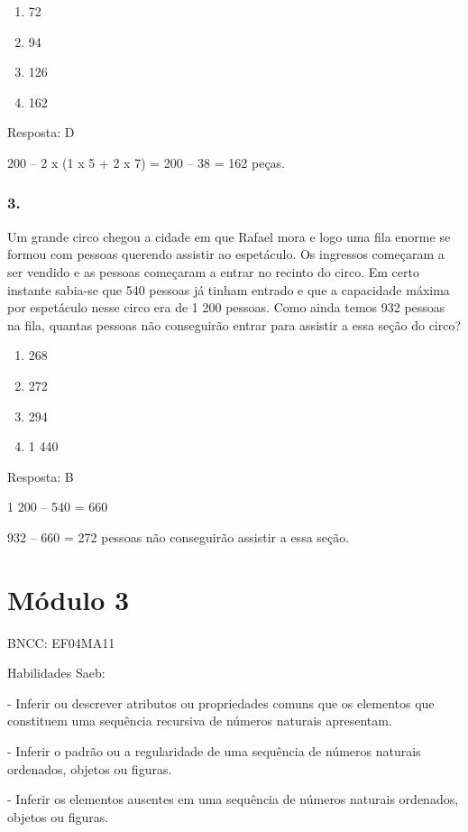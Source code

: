 \begin{enumerate}
\def\labelenumi{\alph{enumi})}
\item
  72
\item
  94
\item
  126
\item
  162
\end{enumerate}

Resposta: D

200 -- 2 x (1 x 5 + 2 x 7) = 200 -- 38 = 162 peças.

\subsubsection{3.}\label{section-25}

Um grande circo chegou a cidade em que Rafael mora e logo uma fila
enorme se formou com pessoas querendo assistir ao espetáculo. Os
ingressos começaram a ser vendido e as pessoas começaram a entrar no
recinto do circo. Em certo instante sabia-se que 540 pessoas já tinham
entrado e que a capacidade máxima por espetáculo nesse circo era de 1
200 pessoas. Como ainda temos 932 pessoas na fila, quantas pessoas não
conseguirão entrar para assistir a essa seção do circo?

\begin{enumerate}
\def\labelenumi{\alph{enumi})}
\item
  268
\item
  272
\item
  294
\item
  1 440
\end{enumerate}

Resposta: B

1 200 -- 540 = 660

932 -- 660 = 272 pessoas não conseguirão assistir a essa seção.

\section{Módulo 3}\label{muxf3dulo-3}

BNCC: EF04MA11

Habilidades Saeb:

- Inferir ou descrever atributos ou propriedades comuns que os elementos
que constituem uma sequência recursiva de números naturais apresentam.

- Inferir o padrão ou a regularidade de uma sequência de números
naturais ordenados, objetos ou figuras.

- Inferir os elementos ausentes em uma sequência de números naturais
ordenados, objetos ou figuras.

